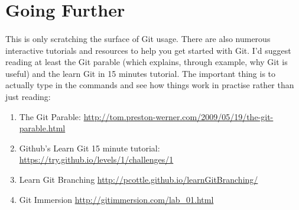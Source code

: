 \documentclass[10pt, a4paper]{article}
\begin{document}
\section{Going Further}

\paragraph{} This is only scratching the surface of Git usage.  There are also numerous interactive tutorials and resources to help you get started with Git. I'd suggest reading at least the Git parable (which explains, through example, why Git is useful) and the learn Git in 15 minutes tutorial. The important thing is to actually type in the commands and see how things work in practise rather than just reading:
\begin{enumerate}
\item The Git Parable: \url{http://tom.preston-werner.com/2009/05/19/the-git-parable.html}
\item Github's Learn Git 15 minute tutorial: \url{https://try.github.io/levels/1/challenges/1}
\item Learn Git Branching \url{http://pcottle.github.io/learnGitBranching/}
\item Git Immersion \url{http://gitimmersion.com/lab_01.html}
\end{enumerate}





\end{document}
